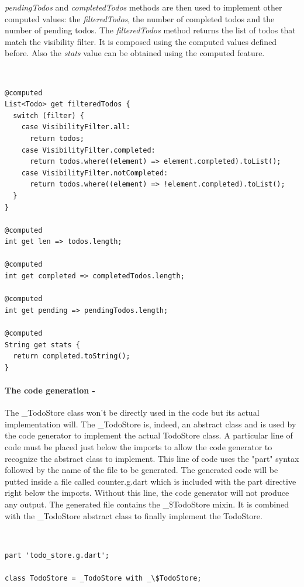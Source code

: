 \textit{pendingTodos} and \textit{completedTodos} methods are then used to implement other computed values: the \textit{filteredTodos}, the number of completed todos and the number of pending todos. The \textit{filteredTodos} method returns the list of todos that match the visibility filter. It is composed using the computed values defined before. Also the \textit{stats} value can be obtained using the computed feature.
\begin{code}
\mbox{}\\
 \mbox{}
		\label{code:2.14}
\begin{verbatim}
@computed
List<Todo> get filteredTodos {
  switch (filter) {
    case VisibilityFilter.all:
      return todos;
    case VisibilityFilter.completed:
      return todos.where((element) => element.completed).toList();
    case VisibilityFilter.notCompleted:
      return todos.where((element) => !element.completed).toList();
  }
}

@computed
int get len => todos.length;

@computed
int get completed => completedTodos.length;

@computed
int get pending => pendingTodos.length;

@computed
String get stats {
  return completed.toString();
}
\end{verbatim}
\mbox{}
\end{code}

\paragraph{The code generation - }
\label{subpar:todo_app_bloc_core_state}The \_TodoStore class won’t be directly used in the code but its actual implementation will. The \_TodoStore is, indeed, an abstract class and is used by the code generator to implement the actual TodoStore class. A particular line of code must be placed just below the imports to allow the code generator to recognize the abstract class to implement. This line of code uses the "part" syntax followed by the name of the file to be generated. The generated code will be putted inside a file called counter.g.dart which is included with the part directive right below the imports. Without this line, the code generator will not produce any output. The generated file contains the \_\$TodoStore mixin. It is combined with the \_TodoStore abstract class to finally implement the TodoStore.
\begin{code}
\mbox{}\\
 \mbox{}
		\label{code:2.14}
\begin{verbatim}
part 'todo_store.g.dart';

class TodoStore = _TodoStore with _\$TodoStore;
\end{verbatim}
\mbox{}
\end{code}

